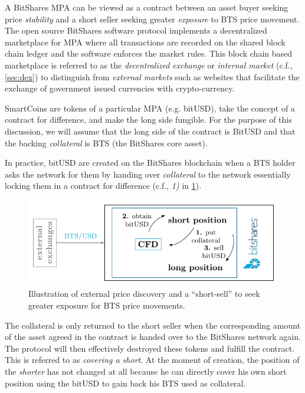 \label{sec:mpa:create}

A BitShares MPA can be viewed as a contract between an asset buyer seeking
price \emph{stability} and a short seller seeking greater \emph{exposure} to
BTS price movement. The open source BitShares software protocol implements a
decentralized marketplace for MPA where all transactions are recorded on the
shared block chain ledger and the software enforces the market rules. This
block chain based marketplace is referred to as the \emph{decentralized
exchange} or \emph{internal market} (c.f., \cref{sec:dex}) to distinguish from
\emph{external markets} such as websites that facilitate the exchange of
government issued currencies with crypto-currency.

SmartCoins are tokens of a particular MPA (e.g. bitUSD), take the concept of a
contract for difference, and make the long side fungible. For the purpose of
this discussion, we will assume that the long side of the contract is BitUSD
and that the backing \emph{collateral} is BTS (the BitShares core asset).

In practice, bitUSD are created on the BitShares blockchain when a BTS holder
asks the network for them by handing over \emph{collateral} to the network
essentially locking them in a contract for difference (c.f., \emph{1)} in
\cref{fig:btsdex}).

\begin{figure}[!htp]
 \begin{center}
  \includegraphics[width=.8\linewidth]{figures/external-pricefeed}
 \end{center}
 \caption{Illustration of external price discovery and a ``short-sell'' to seek
          greater exposure for BTS price movements.}
 \label{fig:btsdex}
\end{figure}

The collateral is only returned to the short seller when the corresponding
amount of the asset agreed in the contract is handed over to the BitShares
network again. The protocol will then effectively destroyed these tokens and
fulfill the contract. This is referred to as \emph{covering a
short}. At the moment of creation, the position of the \emph{shorter} has not
changed at all because he can directly cover his own short position using the
bitUSD to gain back his BTS used as collateral.

